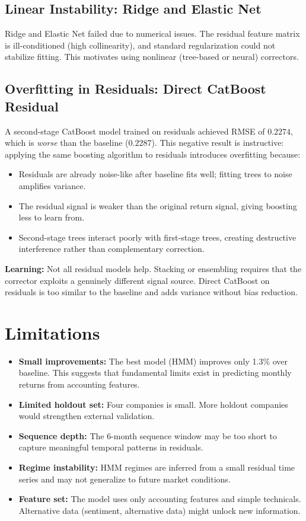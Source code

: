 \documentclass[11pt]{article}
\begin{document}
\subsection{Linear Instability: Ridge and Elastic Net}
Ridge and Elastic Net failed due to numerical issues. The residual feature matrix is ill-conditioned (high collinearity), and standard regularization could not stabilize fitting. This motivates using nonlinear (tree-based or neural) correctors.

\subsection{Overfitting in Residuals: Direct CatBoost Residual}
A second-stage CatBoost model trained on residuals achieved RMSE of $0.2274$, which is \textit{worse} than the baseline ($0.2287$). This negative result is instructive: applying the same boosting algorithm to residuals introduces overfitting because:
\begin{itemize}[leftmargin=1.2em]
    \item Residuals are already noise-like after baseline fits well; fitting trees to noise amplifies variance.
    \item The residual signal is weaker than the original return signal, giving boosting less to learn from.
    \item Second-stage trees interact poorly with first-stage trees, creating destructive interference rather than complementary correction.
\end{itemize}
\textbf{Learning:} Not all residual models help. Stacking or ensembling requires that the corrector exploits a genuinely different signal source. Direct CatBoost on residuals is too similar to the baseline and adds variance without bias reduction.



\section{Limitations}

\begin{itemize}[leftmargin=1.2em]
    \item \textbf{Small improvements:} The best model (HMM) improves only 1.3\% over baseline. This suggests that fundamental limits exist in predicting monthly returns from accounting features.
    \item \textbf{Limited holdout set:} Four companies is small. More holdout companies would strengthen external validation.
    \item \textbf{Sequence depth:} The 6-month sequence window may be too short to capture meaningful temporal patterns in residuals.
    \item \textbf{Regime instability:} HMM regimes are inferred from a small residual time series and may not generalize to future market conditions.
    \item \textbf{Feature set:} The model uses only accounting features and simple technicals. Alternative data (sentiment, alternative data) might unlock new information.
\end{itemize}
\end{document}
